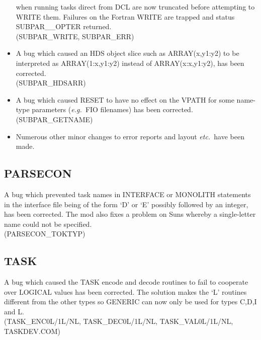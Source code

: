 \begin{itemize}
when running tasks direct from DCL are now truncated before attempting to
WRITE them.
Failures on the Fortran WRITE are trapped and status SUBPAR\_\_OPTER returned.\\
(SUBPAR\_WRITE, SUBPAR\_ERR)
\item A bug which caused an HDS object slice such as ARRAY(x,y1:y2) to be
interpreted as ARRAY(1:x,y1:y2) instead of ARRAY(x:x,y1:y2), has been 
corrected.\\
(SUBPAR\_HDSARR)
\item A bug which caused RESET to have no effect on the VPATH for some
name-type parameters ({\em e.g.\ }FIO filenames) has been corrected.\\
(SUBPAR\_GETNAME)
\item Numerous other minor changes to error reports and layout 
{\em etc.\ }have been made.
\end{itemize}

\subsection{PARSECON}
A bug which prevented task names in INTERFACE or MONOLITH statements in the
interface file being of the form `D' or `E' possibly followed by
an integer, has been corrected. The mod also fixes a problem on Suns whereby a 
single-letter name could not be specified.\\
(PARSECON\_TOKTYP)

\subsection{TASK}
A bug which caused the TASK encode and decode routines to fail to cooperate
over LOGICAL values has been corrected. The solution makes the `L' routines
different from the other types so GENERIC can now only be used for types C,D,I
and L.\\
(TASK\_ENC0L/1L/NL, TASK\_DEC0L/1L/NL, TASK\_VAL0L/1L/NL, TASKDEV.COM)

